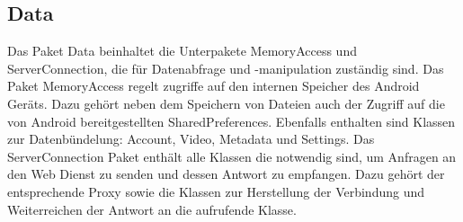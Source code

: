 \label{app:module:data}\subsection{Data}
Das Paket Data beinhaltet die Unterpakete MemoryAccess und ServerConnection, die für Datenabfrage und -manipulation zuständig sind.\newline
Das Paket MemoryAccess regelt zugriffe auf den internen Speicher des Android Geräts. Dazu gehört neben dem Speichern von Dateien auch der Zugriff auf die von Android bereitgestellten SharedPreferences. Ebenfalls enthalten sind Klassen zur Datenbündelung: Account, Video, Metadata und Settings.\newline
Das ServerConnection Paket enthält alle Klassen die notwendig sind, um Anfragen an den Web Dienst zu senden und dessen Antwort zu empfangen. Dazu gehört der entsprechende Proxy sowie die Klassen zur Herstellung der Verbindung und Weiterreichen der Antwort an die aufrufende Klasse.